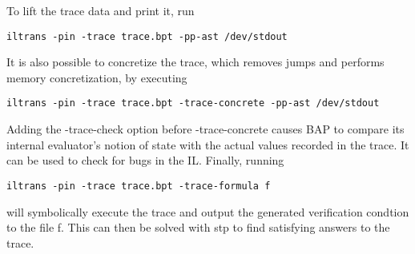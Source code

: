 To lift the trace data and print it, run 

\begin{verbatim}
iltrans -pin -trace trace.bpt -pp-ast /dev/stdout
\end{verbatim}

It is also possible to concretize the trace, which removes jumps and performs
memory concretization, by executing 

\begin{verbatim}
iltrans -pin -trace trace.bpt -trace-concrete -pp-ast /dev/stdout
\end{verbatim}

Adding the -trace-check option before -trace-concrete causes BAP to compare its
internal evaluator's notion of state with the actual values recorded in the
trace.  It can be used to check for bugs in the IL.  Finally, running 

\begin{verbatim}
iltrans -pin -trace trace.bpt -trace-formula f
\end{verbatim}

will symbolically execute the trace and output the generated verification
condtion to the file f. This can then be solved with stp to find satisfying
answers to the trace.
